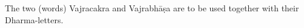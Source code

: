 \documentclass[11pt]{book}
\begin{document}
The two (words) Vajracakra and Vajrabhāṣa are to be used together with their Dharma-letters.

\end{document}
